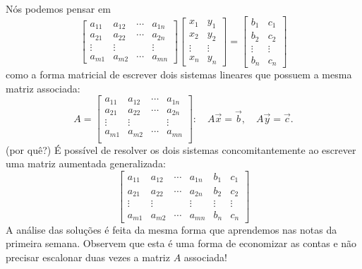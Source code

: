 Nós podemos pensar em
\begin{equation}
\left[
\begin{array}{cccc}
a_{11} & a_{12} & \cdots & a_{1n} \\
a_{21} & a_{22} & \cdots & a_{2n} \\
\vdots & \vdots &        & \vdots \\
a_{m1} & a_{m2} & \cdots & a_{mn} 
\end{array}
\right]
\left[
\begin{array}{cc}
x_{1} & y_1 \\
x_{2} & y_2 \\
\vdots & \vdots \\
x_{n} & y_n 
\end{array}
\right] =
\left[
\begin{array}{cc}
b_1 & c_1 \\
b_2 & c_2 \\
\vdots & \vdots \\
b_{n} & c_{n}
\end{array}
\right]
\end{equation} como a forma matricial de escrever dois sistemas lineares que possuem a mesma matriz associada:
\begin{equation}
A =
\left[
\begin{array}{cccc}
a_{11} & a_{12} & \cdots & a_{1n} \\
a_{21} & a_{22} & \cdots & a_{2n} \\
\vdots & \vdots &        & \vdots \\
a_{m1} & a_{m2} & \cdots & a_{mn} \\
\end{array}
\right]: \quad A \vec{x} = \vec{b}, \quad A \vec{y} = \vec{c}.
\end{equation} (por quê?) É possível de resolver os dois sistemas concomitantemente ao escrever uma matriz aumentada generalizada:
\begin{equation}
\left[
\begin{array}{cccc|cc}
a_{11} & a_{12} & \cdots & a_{1n} & b_1 & c_1 \\
a_{21} & a_{22} & \cdots & a_{2n} & b_2 & c_2\\
\vdots & \vdots &        & \vdots  & \vdots & \vdots \\
a_{m1} & a_{m2} & \cdots & a_{mn} & b_{n} & c_{n}
\end{array}
\right]
\end{equation} A análise das soluções é feita da mesma forma que aprendemos nas notas da primeira semana. Observem que esta é uma forma de economizar as contas e não precisar escalonar duas vezes a matriz $A$ associada!

